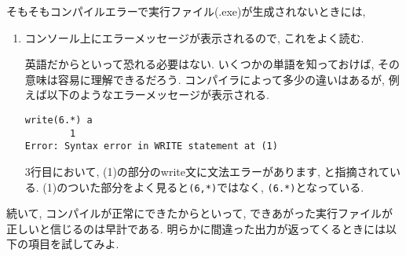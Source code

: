 そもそもコンパイルエラーで実行ファイル(.exe)が生成されないときには,
\begin{enumerate}
\item コンソール上にエラーメッセージが表示されるので, これをよく読む.

英語だからといって恐れる必要はない. いくつかの単語を知っておけば, その意味は容易に理解できるだろう.
コンパイラによって多少の違いはあるが, 例えば以下のようなエラーメッセージが表示される.
\begin{Verbatim}[frame=single]
 write(6.*) a
        1
Error: Syntax error in WRITE statement at (1)
\end{Verbatim}
3行目において, (1)の部分のwrite文に文法エラーがあります, と指摘されている.
(1)のついた部分をよく見ると\verb|(6,*)|ではなく, \verb|(6.*)|となっている.
\end{enumerate}

続いて, コンパイルが正常にできたからといって, できあがった実行ファイルが正しいと信じるのは早計である.
明らかに間違った出力が返ってくるときには以下の項目を試してみよ.

